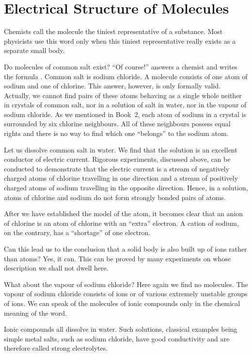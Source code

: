 \section{Electrical Structure of Molecules}

Chemists call the molecule the tiniest representative of a substance. Most physicists use this word only when this tiniest representative really exists as a separate small body.

Do molecules of common salt exist? ``Of course!'' answers a chemist and writes the formula . Common salt is sodium chloride. A molecule consists of one atom of sodium and one of chlorine. This answer, however, is only formally valid. Actually, we cannot find pairs of these atoms behaving as a single whole neither in crystals of common salt, nor in a solution of salt in water, nor in the vapour of sodium chloride. As we mentioned in Book~2, each atom of sodium in a crystal is surrounded by six chlorine neighbours. All of these neighbours possess equal rights and there is no way to find which one ``belongs'' to the sodium atom.

Let us dissolve common salt in water. We find that the solution is an excellent conductor of electric current. Rigorous experiments, discussed above, can be conducted to demonstrate that the electric current is a stream of negatively charged atoms of chlorine travelling in one direction and a stream of positively charged atoms of sodium travelling in the opposite direction. Hence, in a solution, atoms of chlorine and sodium do not form strongly bonded pairs of atoms.

After we have established the model of the atom, it becomes clear that an anion of chlorine is an atom of chlorine with an ``extra'' electron. A cation of sodium, on the contrary, has a ``shortage'' of one electron.

Can this lead us to the conclusion that a solid body is also built up of ions rather than atoms? Yes, it can. This can be proved by many experiments on whose description we shall not dwell here.

What about the vapour of sodium chloride? Here again we find no molecules. The vapour of sodium chloride consists of ions or of various extremely unstable groups of ions. We can speak of the molecules of ionic compounds only in the chemical meaning of the word.

Ionic compounds all dissolve in water. Such solutions, classical examples being simple metal salts, such as sodium chloride, have good conductivity and are therefore called strong electrolytes.

